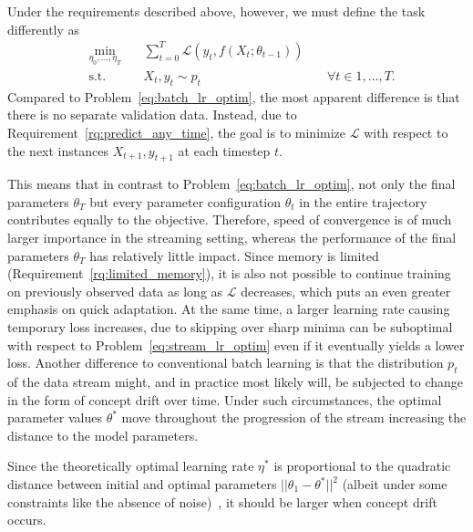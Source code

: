 \documentclass[letterpaper]{article} %
\begin{document}
Under the requirements described above, however, we must define the task differently as
\begin{equation}
	\label{eq:stream_lr_optim}
	\begin{alignedat}{3}
		& \!\min_{\eta_0, \ldots, \eta_T} & \, & \sum_{t=0}^{T}\mathcal{L}(y_t, f(X_t; \theta_{t-1})) &    &                               \\
		& \text{s.t.}                     &    & X_t, y_t  \sim p_t                           & \  & \forall t \in {1, \ldots, T}.
	\end{alignedat}
\end{equation}
Compared to Problem~\eqref{eq:batch_lr_optim}, the most apparent difference is that there is no separate validation data.
Instead, due to Requirement~\ref{rq:predict_any_time}, the goal is to minimize $\mathcal{L}$ with respect to the next instances $X_{t+1}, y_{t+1}$ at each timestep $t$.

This means that in contrast to Problem~\eqref{eq:batch_lr_optim}, not only the final parameters $\theta_T$ but every parameter configuration $\theta_t$ in the entire trajectory contributes equally to the objective.
Therefore, speed of convergence is of much larger importance in the streaming setting, whereas the performance of the final parameters $\theta_T$ has relatively little impact.
Since memory is limited (Requirement~\ref{rq:limited_memory}), it is also not possible to continue training on previously observed data as long as $\mathcal{L}$ decreases, which puts an even greater emphasis on quick adaptation.
At the same time, a larger learning rate causing temporary loss increases, due to skipping over sharp minima can be suboptimal with respect to Problem~\ref{eq:stream_lr_optim} even if it eventually yields a lower loss.
Another difference to conventional batch learning is that the distribution $p_t$ of the data stream might, and in practice most likely will, be subjected to change in the form of concept drift over time.
Under such circumstances, the optimal parameter values $\theta^*$ move throughout the progression of the stream increasing the distance to the model parameters.

Since the theoretically optimal learning rate $\eta^*$ is proportional to the quadratic distance between initial and optimal parameters $||\theta_1 - \theta^*||^2$ (albeit under some constraints like the absence of noise)~\cite{carmonMakingSGDParameterFree2023}, it should be larger when concept drift occurs.
\end{document}
